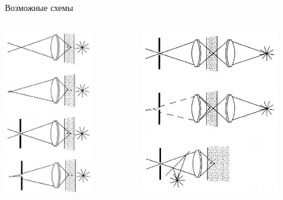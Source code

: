 \documentclass[9pt, compress, xcolor=table]{beamer}
\begin{document}
\begin{frame}{Возможные схемы}
\begin{columns}[c]
\column{6.3cm}
\begin{center}
\includegraphics[width=0.7\textwidth]{fig4_08a}
\end{center}
\column{6.3cm}
\begin{center}
\includegraphics[width=0.8\textwidth]{fig4_08b}
\end{center}


\end{columns}
\end{frame}
\end{document}
